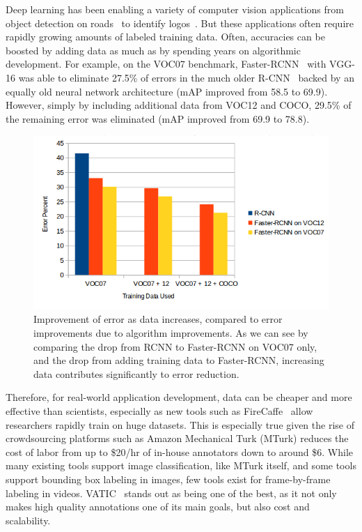 Deep learning has been enabling a variety of computer vision applications from object detection on roads~\cite{road-obj-detection} to identify logos~\cite{logos}.
But these applications often require rapidly growing amounts of labeled training data.
Often, accuracies can be boosted by adding data as much as by spending years on algorithmic development.
For example, on the VOC07 benchmark, Faster-RCNN~\cite{FasterRCNN} with VGG-16 was able to eliminate 27.5\% of errors in the much older R-CNN~\cite{RCNN} backed by an equally old neural network architecture (mAP improved from 58.5 to 69.9).
However, simply by including additional data from VOC12 and COCO, 29.5\% of the remaining error was eliminated (mAP improved from 69.9 to 78.8).

\begin{figure}[h]
\includegraphics[width=14cm]{figs/data_vs_error.png}
\centering
\caption{Improvement of error as data increases, compared to error improvements due to algorithm improvements.
As we can see by comparing the drop from RCNN to Faster-RCNN on VOC07 only, and the drop from adding training data to Faster-RCNN, increasing data contributes significantly to error reduction.}
\end{figure}

Therefore, for real-world application development, data can be cheaper and more effective than scientists, especially as new tools such as FireCaffe~\cite{firecaffe} allow researchers rapidly train on huge datasets.
This is especially true given the rise of crowdsourcing platforms such as Amazon Mechanical Turk (MTurk) reduces the cost of labor from up to \$20/hr of in-house annotators down to around \$6.
While many existing tools support image classification, like MTurk itself, and some tools support bounding box labeling in images, few tools exist for frame-by-frame labeling in videos.
VATIC~\cite{Vatic} stands out as being one of the best, as it not only makes high quality annotations one of its main goals, but also cost and scalability.

